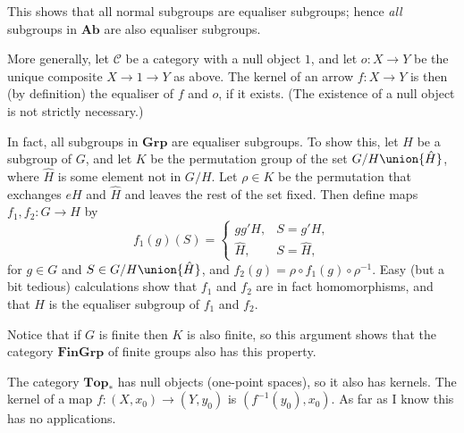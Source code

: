 \documentclass[article, a4paper, 11pt, oneside]{memoir}
\numberwithin{equation}{chapter}
\newcommand{\cat}[1]{\mathcal{#1}}
\newcommand{\ncat}[1]{\mathbf{#1}} %
\newcommand{\catTop}{\ncat{Top}}
\newcommand{\catGrp}{\ncat{Grp}}
\newcommand{\catAb}{\ncat{Ab}}
\newcommand{\catFinGrp}{\ncat{FinGrp}}
\newcommand{\catC}{\cat{C}}
\begin{document}
\begin{examplebreak}
\begin{enumexample}
        This shows that all normal subgroups are equaliser subgroups; hence \emph{all} subgroups in $\catAb$ are also equaliser subgroups.

        More generally, let $\catC$ be a category with a null object $1$, and let $o \colon X \to Y$ be the unique composite $X \to 1 \to Y$ as above. The kernel of an arrow $f \colon X \to Y$ is then (by definition) the equaliser of $f$ and $o$, if it exists. (The existence of a null object is not strictly necessary.)

        \item \label{exam:equaliser_subgroup} In fact, all subgroups in $\catGrp$ are equaliser subgroups. To show this, let $H$ be a subgroup of $G$, and let $K$ be the permutation group of the set $G/H \union \{ \hat H \}$, where $\hat H$ is some element not in $G/H$. Let $\rho \in K$ be the permutation that exchanges $eH$ and $\hat H$ and leaves the rest of the set fixed. Then define maps $f_1, f_2 \colon G \to H$ by
        \begin{equation*}
            f_1(g)(S)
                =
                \begin{cases}
                    gg' H, & S = g' H, \\
                    \hat H, & S = \hat H,
                \end{cases}
        \end{equation*}
        for $g \in G$ and $S \in G/H \union \{ \hat H \}$, and $f_2(g) = \rho \circ f_1(g) \circ \rho^{-1}$. Easy (but a bit tedious) calculations show that $f_1$ and $f_2$ are in fact homomorphisms, and that $H$ is the equaliser subgroup of $f_1$ and $f_2$.

        Notice that if $G$ is finite then $K$ is also finite, so this argument shows that the category $\catFinGrp$ of finite groups also has this property.

        \item The category $\catTop_*$ has null objects (one-point spaces), so it also has kernels. The kernel of a map $f \colon (X, x_0) \to (Y, y_0)$ is $(f^{-1}(y_0), x_0)$. As far as I know this has no applications.
    \end{enumexample}
\end{examplebreak}


        
\end{document}
